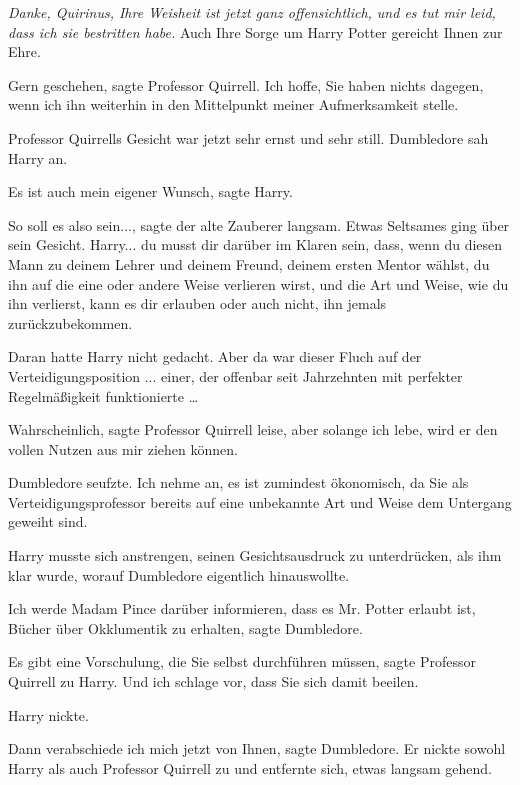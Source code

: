 \glqq{}\emph{Danke, Quirinus, Ihre Weisheit ist jetzt ganz offensichtlich, und es
tut mir leid, dass ich sie bestritten habe.} Auch Ihre Sorge um Harry Potter
gereicht Ihnen zur Ehre.\grqq{}

\glqq{}Gern geschehen\grqq{}, sagte Professor Quirrell. \glqq{}Ich hoffe, Sie
haben nichts dagegen, wenn ich ihn weiterhin in den Mittelpunkt meiner
Aufmerksamkeit stelle.\grqq{}

Professor Quirrells Gesicht war jetzt sehr ernst und sehr still. Dumbledore sah
Harry an.

\glqq{}Es ist auch mein eigener Wunsch\grqq{}, sagte Harry.

\glqq{}So soll es also sein...\grqq{}, sagte der alte Zauberer langsam. Etwas
Seltsames ging über sein Gesicht. \glqq{}Harry... du musst dir darüber im Klaren
sein, dass, wenn du diesen Mann zu deinem Lehrer und deinem Freund, deinem
ersten Mentor wählst, du ihn auf die eine oder andere Weise verlieren wirst, und
die Art und Weise, wie du ihn verlierst, kann es dir erlauben oder auch nicht,
ihn jemals zurückzubekommen.\grqq{}

Daran hatte Harry nicht gedacht. Aber da war dieser Fluch auf der
Verteidigungsposition ... einer, der offenbar seit Jahrzehnten mit perfekter
Regelmäßigkeit funktionierte …

\glqq{}Wahrscheinlich\grqq{}, sagte Professor Quirrell leise, \glqq{}aber solange
ich lebe, wird er den vollen Nutzen aus mir ziehen können.\grqq{}

Dumbledore seufzte. \glqq{}Ich nehme an, es ist zumindest ökonomisch, da Sie als
Verteidigungsprofessor bereits auf eine unbekannte Art und Weise dem Untergang
geweiht sind.\grqq{}

Harry musste sich anstrengen, seinen Gesichtsausdruck zu unterdrücken, als ihm
klar wurde, worauf Dumbledore eigentlich hinauswollte.

\glqq{}Ich werde Madam Pince darüber informieren, dass es Mr. Potter erlaubt ist,
Bücher über Okklumentik zu erhalten\grqq{}, sagte Dumbledore.

\glqq{}Es gibt eine Vorschulung, die Sie selbst durchführen müssen\grqq{}, sagte
Professor Quirrell zu Harry. \glqq{}Und ich schlage vor, dass Sie sich damit
beeilen.\grqq{}

Harry nickte.

\glqq{}Dann verabschiede ich mich jetzt von Ihnen\grqq{}, sagte Dumbledore. Er
nickte sowohl Harry als auch Professor Quirrell zu und entfernte sich, etwas
langsam gehend.

